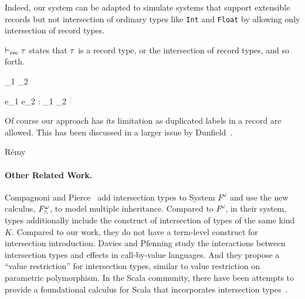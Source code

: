 Indeed, our system can be adapted to simulate systems that support extensible
records but not intersection of ordinary types like \texttt{Int} and
\texttt{Float} by allowing only intersection of record types.

$ \vdash_{\textrm{rec}} \tau $ states that $ \tau $ is a record type, or the intersection of
record types, and so forth.


{\turnsrec \ty_1 \intersects \ty_2}

{\Gamma \turns e_1 \dcomma e_2 : \ty_1 \intersects \ty_2 }

Of course our approach has its limitation as duplicated labels in a record are
allowed. This has been discussed in a larger issue by
Dunfield~\cite{dunfield2014elaborating}.

R{\'e}my~\cite{remy1989type}

\paragraph{Other Related Work.}

Compagnoni and Pierce~\cite{compagnoni1996higher} add intersection types to
System $ F^{\omega} $ and use the new calculus, $ F^{\omega}_{\wedge} $, to
model multiple inheritance. Compared to $ F^{\omega} $, in their system, types
additionally include the construct of intersection of types of the same kind
$ K $. Compared to our work, they do not have a term-level construct for
intersection introduction. Davies and Pfenning \cite{davies2000intersection}
study the interactions between intersection types and effects in call-by-value
languages. And they propose a ``value restriction'' for intersection types,
similar to value restriction on parametric polymorphism. In the Scala community,
there have been attempts to provide a foundational calculus for Scala that
incorporates intersection types~\cite{amin2014foundations,amin2012dependent}.
